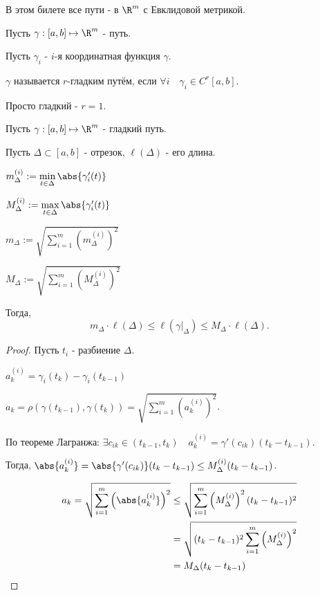
В этом билете все пути - в $\R^{m}$ с Евклидовой метрикой.

\begin{definition}[повтор] \thmslashn 

    Пусть $\gamma : [a, b] \mapsto \R^{m}$ - путь.

    Пусть $\gamma_{i} $ - $i$-я координатная функция $\gamma$.

    $\gamma$ называется $r$-гладким путём, если $\forall{i}\quad \gamma_{i}\in C^{r}[a, b]$.

    Просто гладкий - $r = 1$.
\end{definition}

\begin{lemma} \thmslashn

    Пусть $\gamma : [a, b] \mapsto \R^{m}$ - гладкий путь.

    Пусть $\Delta \subset [a, b]$ - отрезок, $\ell(\Delta)$ - его длина.

    $m^{(i)}_{\Delta} := \min\limits_{t\in \Delta} \abs{\gamma_{i}'(t)}$
    
    $M^{(i)}_{\Delta} := \max\limits_{t\in \Delta} \abs{\gamma_{i}'(t)}$

    $m_{\Delta} := \sqrt{\sum\limits_{i=1}^{m} \left(m^{(i)}_{\Delta}\right)^2} $
    
    $M_{\Delta} := \sqrt{\sum\limits_{i=1}^{m} \left(M^{(i)}_{\Delta}\right)^2}$

    Тогда, 
    \[ m_{\Delta} \cdot \ell(\Delta) \le \ell(\left. \gamma\right|_{\Delta}) \le M_{\Delta} \cdot \ell(\Delta) .\]
        \begin{proof} \thmslashn
        
            Пусть $t_{i}$ - разбиение $\Delta$.

            $a_{k}^{(i)} = \gamma_{i}(t_{k}) - \gamma_{i}(t_{k-1})$

            $a_{k} = \rho(\gamma(t_{k-1}), \gamma(t_{k})) = \sqrt{\sum\limits_{i=1}^{m} \left( a_{k}^{(i)} \right)^2 } $.

            По теореме Лагранжа: $\exists{c_{ik}\in (t_{k-1}, t_{k})}\quad a_{k}^{(i)} = \gamma'(c_{ik})(t_{k} - t_{k-1})$.

            Тогда, $\abs{a_{k}^{(i)}} = \abs{\gamma'(c_{ik})}(t_{k}-t_{k-1}) \le M_{\Delta}^{(i)}(t_{k}-t_{k-1})$.

            \begin{equation*}
                \begin{split}
                    a_{k} = \sqrt{\sum\limits_{i=1}^{m} \left( \abs{a_{k}^{(i)}} \right)^2} 
                    &\le \sqrt{\sum\limits_{i=1}^{m} \left(M_{\Delta}^{(i)}\right)^2(t_{k}-t_{k-1})^2}\\
                    &= \sqrt{(t_{k} - t_{k-1})^2 \sum\limits_{i=1}^{m} \left(M_{\Delta}^{(i)}\right)^2 }\\
                    &= M_{\Delta}(t_{k}-t_{k-1})
                \end{split}
            \end{equation*}
            

\end{proof}
\end{lemma}
